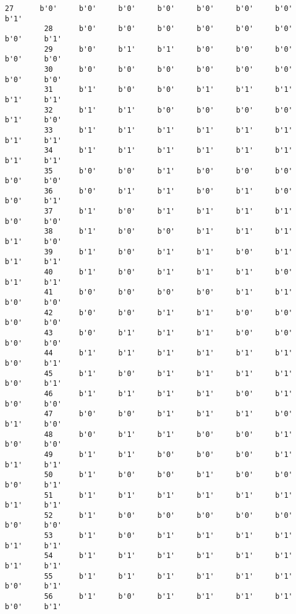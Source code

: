 \documentclass[11pt]{article}
\begin{document}
\begin{Verbatim}[commandchars=\\\{\}]
         27      b'0'     b'0'     b'0'     b'0'     b'0'     b'0'     b'0'     b'1'   
         28      b'0'     b'0'     b'0'     b'0'     b'0'     b'0'     b'0'     b'1'   
         29      b'0'     b'1'     b'1'     b'0'     b'0'     b'0'     b'0'     b'0'   
         30      b'0'     b'0'     b'0'     b'0'     b'0'     b'0'     b'0'     b'0'   
         31      b'1'     b'0'     b'0'     b'1'     b'1'     b'1'     b'1'     b'1'   
         32      b'1'     b'1'     b'0'     b'0'     b'0'     b'0'     b'1'     b'0'   
         33      b'1'     b'1'     b'1'     b'1'     b'1'     b'1'     b'1'     b'1'   
         34      b'1'     b'1'     b'1'     b'1'     b'1'     b'1'     b'1'     b'1'   
         35      b'0'     b'0'     b'1'     b'0'     b'0'     b'0'     b'0'     b'0'   
         36      b'0'     b'1'     b'1'     b'0'     b'1'     b'0'     b'0'     b'1'   
         37      b'1'     b'0'     b'1'     b'1'     b'1'     b'1'     b'0'     b'0'   
         38      b'1'     b'0'     b'0'     b'1'     b'1'     b'1'     b'1'     b'0'   
         39      b'1'     b'0'     b'1'     b'1'     b'0'     b'1'     b'1'     b'1'   
         40      b'1'     b'0'     b'1'     b'1'     b'1'     b'0'     b'1'     b'1'   
         41      b'0'     b'0'     b'0'     b'0'     b'1'     b'1'     b'0'     b'0'   
         42      b'0'     b'0'     b'1'     b'1'     b'0'     b'0'     b'0'     b'0'   
         43      b'0'     b'1'     b'1'     b'1'     b'0'     b'0'     b'0'     b'0'   
         44      b'1'     b'1'     b'1'     b'1'     b'1'     b'1'     b'0'     b'1'   
         45      b'1'     b'0'     b'1'     b'1'     b'1'     b'1'     b'0'     b'1'   
         46      b'1'     b'1'     b'1'     b'1'     b'0'     b'1'     b'0'     b'0'   
         47      b'0'     b'0'     b'1'     b'1'     b'1'     b'0'     b'1'     b'0'   
         48      b'0'     b'1'     b'1'     b'0'     b'0'     b'1'     b'0'     b'0'   
         49      b'1'     b'1'     b'0'     b'0'     b'0'     b'1'     b'1'     b'1'   
         50      b'1'     b'0'     b'0'     b'1'     b'0'     b'0'     b'0'     b'1'   
         51      b'1'     b'1'     b'1'     b'1'     b'1'     b'1'     b'1'     b'1'   
         52      b'1'     b'0'     b'0'     b'0'     b'0'     b'0'     b'0'     b'0'   
         53      b'1'     b'0'     b'1'     b'1'     b'1'     b'1'     b'1'     b'1'   
         54      b'1'     b'1'     b'1'     b'1'     b'1'     b'1'     b'1'     b'1'   
         55      b'1'     b'1'     b'1'     b'1'     b'1'     b'1'     b'0'     b'1'   
         56      b'1'     b'0'     b'1'     b'1'     b'1'     b'1'     b'0'     b'1'   

\end{Verbatim}
\end{document}
